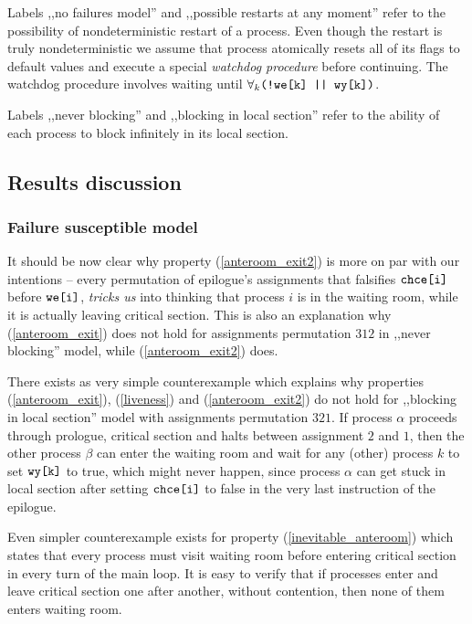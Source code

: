Labels ,,no failures model'' and ,,possible restarts at any moment'' refer to the possibility of nondeterministic restart of a process.
Even though the restart is truly nondeterministic we assume that process atomically resets all of its flags to default values and execute a special \emph{watchdog procedure} before continuing.
The watchdog procedure involves waiting until $\forall_k \verb+(!we[k] || wy[k])+$.

Labels ,,never blocking'' and ,,blocking in local section'' refer to the ability of each process to block infinitely in its local section.

\subsection*{Results discussion}

\subsubsection*{Failure susceptible model}

It should be now clear why property (\ref{anteroom_exit2}) is more on par with our intentions -- every permutation of epilogue's assignments that falsifies $\verb+chce[i]+$ before $\verb+we[i]+$, \emph{tricks us} into thinking that process $i$ is in the waiting room, while it is actually leaving critical section.
This is also an explanation why (\ref{anteroom_exit}) does not hold for assignments permutation $312$ in ,,never blocking'' model, while (\ref{anteroom_exit2}) does.

There exists as very simple counterexample which explains why properties (\ref{anteroom_exit}), (\ref{liveness}) and (\ref{anteroom_exit2}) do not hold for ,,blocking in local section'' model with assignments permutation $321$.
If process $\alpha$ proceeds through prologue, critical section and halts between assignment $2$ and $1$, then the other process $\beta$ can enter the waiting room and wait for any (other) process $k$ to set $\verb+wy[k]+$ to true, which might never happen, since process $\alpha$ can get stuck in local section after setting $\verb+chce[i]+$ to false in the very last instruction of the epilogue.

Even simpler counterexample exists for property (\ref{inevitable_anteroom}) which states that every process must visit waiting room before entering critical section in every turn of the main loop.
It is easy to verify that if processes enter and leave critical section one after another, without contention, then none of them enters waiting room.

